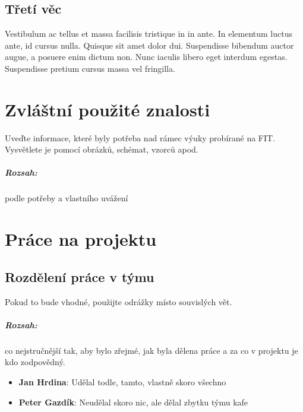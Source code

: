 \documentclass[12pt,a4paper,titlepage,final]{report}
\newcommand\AuthorA{Jan Hrdina}
\newcommand\AuthorB{Peter Gazdík}
\begin{document}
\section{Třetí věc}

Vestibulum ac tellus et massa facilisis tristique in in ante. In elementum luctus ante, id cursus nulla. Quisque sit amet dolor dui. Suspendisse bibendum auctor augue, a posuere enim dictum non. Nunc iaculis libero eget interdum egestas. Suspendisse pretium cursus massa vel fringilla.



\chapter{Zvláštní použité znalosti}

Uveďte informace, které byly potřeba nad rámec výuky probírané na FIT.
Vysvětlete je pomocí obrázků, schémat, vzorců apod.

\paragraph{Rozsah:} podle potřeby a vlastního uvážení


\chapter{Práce na projektu}

\section{Rozdělení práce v týmu}
Pokud to bude vhodné, použijte odrážky místo souvislých vět.

\paragraph{Rozsah:} co nejstručnější tak, aby bylo zřejmé, jak byla dělena práce a za co v
projektu je kdo zodpovědný.

\begin{itemize}
\item \textbf{\AuthorA}: Udělal todle, tamto, vlastně skoro všechno
\item \textbf{\AuthorB}: Neudělal skoro nic, ale dělal zbytku týmu kafe
\end{itemize}
\end{document}
